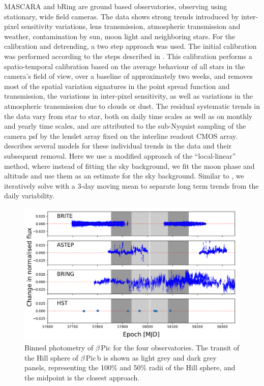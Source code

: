 \documentclass[longauth]{aa} %
\newcommand{\bpb}{$\beta$\,Pic\,b}
\newcommand{\bp}{$\beta$\,Pic}
\begin{document}
MASCARA and bRing are ground based observatories, observing using stationary, wide field cameras.
%
The data shows strong trends introduced by inter-pixel sensitivity variations, lens transmission, atmospheric transmission and weather, contamination by sun, moon light and neighboring stars.
%
For the calibration and detrending, a two step approach was used.
%
The initial calibration was performed according to the steps described in \citet{talens2018}.
%
This calibration performs a spatio-temporal calibration based on the average behaviour of all stars in the camera's field of view, over a baseline of approximately two weeks, and removes most of the spatial variation signatures in the point spread function and transmission, the variations in inter-pixel sensitivity, as well as variations in the atmospheric transmission due to clouds or dust.
%
The residual systematic trends in the data vary from star to star, both on daily time scales as well as on monthly and yearly time scales, and are attributed to the sub-Nyquist sampling of the camera \ac{psf} by the lenslet array fixed on the interline readout CMOS array.
%
\citet{talens2018} describes several models for these individual trends in the data and their subsequent removal.
%
Here we use a modified approach of the ``local-linear'' method, where instead of fitting the sky background, we fit the moon phase and altitude and use them as an estimate for the sky background.
%
Similar to \cite{talens2018}, we iteratively solve with a 3-day moving mean to separate long term trends from the daily variability.
%


\begin{figure}[htb]
\centering
\includegraphics[width=1.0\textwidth]{all_binned_photometry.pdf}
\caption{Binned photometry of \bp{} for the four observatories. The transit of the Hill sphere of \bpb{} is shown as light grey and dark grey panels, representing the 100\% and 50\% radii of the Hill sphere, and the midpoint is the closest approach.}
\label{fig:binnedphot}
\end{figure}
\end{document}
